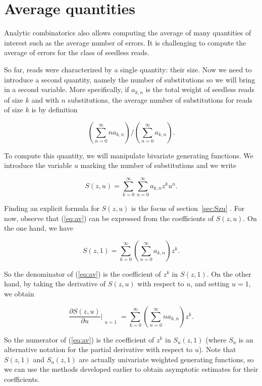 \documentclass{article}
\begin{document}
\section{Average quantities}
\label{sec:av}

Analytic combinatorics also allows computing the average of many
quantities of interest such as the average number of errors.  It is
challenging to compute the average of errors for the class of seedless
reads.

So far, reads were characterized by a single quantity: their size. Now we
need to introduce a second quantity, namely the number of substitutions so
we will bring in a second variable. More specifically, if $a_{k,n}$ is the
total weight of seedless reads of size $k$ and with $n$ substitutions, the
average number of substitutions for reads of size $k$ is by definition


\begin{equation}
\label{eq:av}
\left( \sum_{n=0}^\infty na_{k,n} \right) \Big/
 \left( \sum_{n=0}^\infty a_{k,n} \right).
\end{equation}

To compute this quantity, we will manipulate bivariate generating
functions. We introduce the variable $u$ marking the number of
substitutions and we write

\begin{equation*}
S(z,u) = \sum_{k=0}^\infty\sum_{n=0}^\infty a_{k,n}z^ku^n.
\end{equation*}

Finding an explicit formula for $S(z,u)$ is the focus of
section~\ref{sec:Szu} .  For now, observe that (\ref{eq:av}) can be
expressed from the coefficients of $S(z,u)$. On the one hand, we have

\begin{equation*}
S(z,1) = \sum_{k=0}^\infty \left( \sum_{n=0}^\infty a_{k,n} \right) z^k.
\end{equation*}

So the denominator of (\ref{eq:av}) is the coefficient of $z^k$ in
$S(z,1)$. On the other hand, by taking the derivative of $S(z,u)$ with
respect to $u$, and setting $u=1$, we obtain

\begin{equation*}
\frac{\partial S(z,u)}{\partial u} \Bigr|_{\substack{\\u=1}} =
\sum_{k=0}^\infty \left( \sum_{n=0}^\infty na_{k,n} \right) z^k.
\end{equation*}

So the numerator of (\ref{eq:av}) is the coefficient of $z^k$ in
$S_u(z,1)$ (where $S_u$ is an alternative notation for the partial
derivative with respect to $u$). Note that $S(z,1)$ and $S_u(z,1)$ are
actually univariate weighted generating functions, so we can use the
methods developed earlier to obtain asymptotic estimates for their
coefficients.
\end{document}
